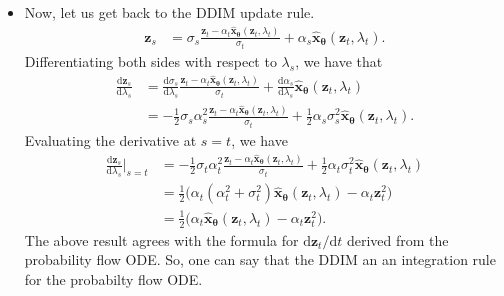 \documentclass[10pt]{article}
\newcommand{\dee}{\mathrm{d}}
\newcommand{\ve}[1]{\mathbf{#1}}
\newcommand{\ves}[1]{\boldsymbol{#1}}
\begin{document}
\begin{itemize}
  \item Now, let us get back to the DDIM update rule.
  \begin{align*}
    \ve{z}_s &= \sigma_s\frac{\ve{z}_t - \alpha_t \hat{\ve{x}}_{\ves{\theta}}(\ve{z}_t, \lambda_t)}{\sigma_t} + \alpha_s \hat{\ve{x}}_{\ves{\theta}}(\ve{z}_t, \lambda_t).
  \end{align*}
  Differentiating both sides with respect to $\lambda_s$, we have that
  \begin{align*}
    \frac{\dee \ve{z}_s}{\dee \lambda_s} &= \frac{\dee \sigma_s}{\dee \lambda_s} \frac{\ve{z}_t - \alpha_t \hat{\ve{x}}_{\ves{\theta}}(\ve{z}_t, \lambda_t)}{\sigma_t} + \frac{\dee \alpha_s}{\dee \lambda_s} \hat{\ve{x}}_{\ves{\theta}}(\ve{z}_t, \lambda_t) \\
    &= -\frac{1}{2} \sigma_s \alpha_s^2 \frac{\ve{z}_t - \alpha_t \hat{\ve{x}}_{\ves{\theta}}(\ve{z}_t, \lambda_t)}{\sigma_t} + \frac{1}{2} \alpha_s \sigma_s^2 \hat{\ve{x}}_{\ves{\theta}}(\ve{z}_t, \lambda_t).
  \end{align*}
  Evaluating the derivative at $s = t$, we have
  \begin{align*}
    \frac{\dee \ve{z}_s}{\dee \lambda_s} \bigg|_{s=t}
    &= -\frac{1}{2} \sigma_t \alpha_t^2 \frac{\ve{z}_t - \alpha_t \hat{\ve{x}}_{\ves{\theta}}(\ve{z}_t, \lambda_t)}{\sigma_t} + \frac{1}{2} \alpha_t \sigma_t^2 \hat{\ve{x}}_{\ves{\theta}}(\ve{z}_t, \lambda_t) \\
    &= \frac{1}{2} \big( \alpha_t(\alpha_t^2 + \sigma_t^2) \hat{\ve{x}}_{\ves{\theta}}(\ve{z}_t, \lambda_t) -\alpha_t \ve{z}_t^2 \big) \\
    &= \frac{1}{2} \big( \alpha_t \hat{\ve{x}}_{\ves{\theta}}(\ve{z}_t, \lambda_t) -\alpha_t \ve{z}_t^2 \big).
  \end{align*}
  The above result agrees with the formula for $\dee \ve{z}_t / \dee t$ derived from the probability flow ODE. So, one can say that the DDIM an an integration rule for the probabilty flow ODE.
\end{itemize}


  
\end{document}
